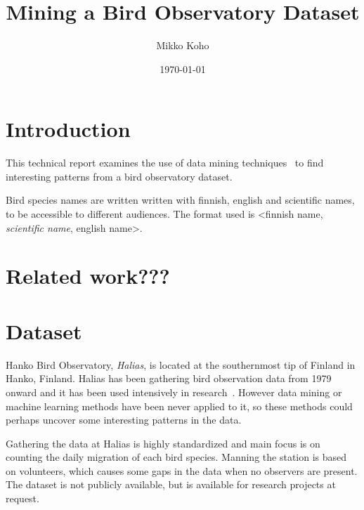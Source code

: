 \documentclass[english]{tktltiki2}
\title{Mining a Bird Observatory Dataset}
\author{Mikko Koho}
\date{\today}
\begin{document}
    

\frontmatter      %

\maketitle        %

\makeabstract     %

\tableofcontents  %


\mainmatter       %


\section{Introduction}

This technical report examines the use of data mining techniques~\cite{tan2006introduction} to find interesting patterns from a bird observatory dataset.

Bird species names are written written with finnish, english and scientific names, to be accessible to different audiences. The format used is <finnish name, \emph{scientific name}, english name>.


\section{Related work???}


\section{Dataset}

Hanko Bird Observatory, \emph{Halias}, is located at the southernmost tip of Finland in Hanko, Finland. Halias has been gathering bird observation data from 1979 onward and it has been used intensively in research~\cite{HangonJulkaisut}. However data mining or machine learning methods have been never applied to it, so these methods could perhaps uncover some interesting patterns in the data.

Gathering the data at Halias is highly standardized and main focus is on counting the daily migration of each bird species. Manning the station is based on volunteers, which causes some gaps in the data when no observers are present.
The dataset is not publicly available, but is available for research projects at request.
\end{document}
